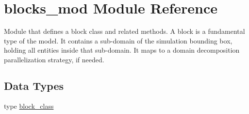 \hypertarget{namespaceblocks__mod}{}\section{blocks\+\_\+mod Module Reference}
\label{namespaceblocks__mod}


Module that defines a block class and related methods. A block is a fundamental type of the model. It contains a sub-\/domain of the simulation bounding box, holding all entities inside that sub-\/domain. It maps to a domain decomposition parallelization strategy, if needed.  


\subsection*{Data Types}
\begin{DoxyCompactItemize}
\item 
type \mbox{\hyperlink{structblocks__mod_1_1block__class}{block\+\_\+class}}
\end{DoxyCompactItemize}
